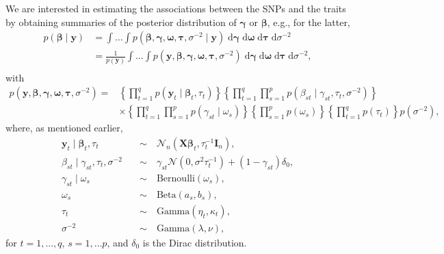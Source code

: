 \documentclass[a4paper, 11pt]{report}
\numberwithin{equation}{chapter}
\begin{document}
We are interested in estimating the associations between the SNPs and the traits by obtaining summaries of the posterior distribution of $\boldsymbol{\gamma}$ or $\boldsymbol{\beta}$, e.g., for the latter,
\begin{align*}
p(\boldsymbol{\beta}\mid\boldsymbol{y})&=\int\dots\int p(\boldsymbol{\beta},\boldsymbol{\gamma},\boldsymbol{\omega},\boldsymbol{\tau},\sigma^{-2}\mid\boldsymbol{y})\;\mathrm{d}\boldsymbol{\gamma}\;\mathrm{d}\boldsymbol{\omega}\;\mathrm{d}\boldsymbol{\tau}\;\mathrm{d}\sigma^{-2}\\
&=\frac{1}{p(\boldsymbol{y})}\int\dots\int p(\boldsymbol{y},\boldsymbol{\beta},\boldsymbol{\gamma},\boldsymbol{\omega},\boldsymbol{\tau},\sigma^{-2})\;\mathrm{d}\boldsymbol{\gamma}\;\mathrm{d}\boldsymbol{\omega}\;\mathrm{d}\boldsymbol{\tau}\;\mathrm{d}\sigma^{-2},\\
\end{align*}
with 
\begin{align*}
p(\boldsymbol{y},\boldsymbol{\beta},\boldsymbol{\gamma},\boldsymbol{\omega},\boldsymbol{\tau},\sigma^{-2}) = &\left\lbrace\prod_{t=1}^qp(\boldsymbol{y}_t \mid \boldsymbol{\beta}_t,\tau_t)\right\rbrace\left\lbrace\prod_{t=1}^q\prod_{s=1}^p p(\beta_{st} \mid \gamma_{st},\tau_t,\sigma^{-2})\right\rbrace\\
&\times \left\lbrace \prod_{t=1}^q\prod_{s=1}^p p(\gamma_{st} \mid \omega_s)\right\rbrace\left\lbrace \prod_{s=1}^p p(\omega_s)\right\rbrace\left\lbrace\prod_{t=1}^q p(\tau_t)\right\rbrace p(\sigma^{-2}),
\end{align*}
where, as mentioned earlier,
\begin{align*}
\boldsymbol{y}_t \mid \boldsymbol{\beta}_t,\tau_t \quad &\sim \quad \mathcal{N}_n\left(\boldsymbol{X}\boldsymbol{\beta}_t,\tau_t^{-1}\boldsymbol{I}_n\right),\\
\beta_{st} \mid \gamma_{st},\tau_t,\sigma^{-2} \quad &\sim \quad \gamma_{st}\mathcal{N}\left(0,\sigma^2\tau_t^{-1}\right)+(1-\gamma_{st})\delta_0,\\
\gamma_{st} \mid \omega_s \quad &\sim \quad \mathrm{Bernoulli}(\omega_s),\\
\omega_s \quad &\sim \quad \mathrm{Beta}(a_s,b_s),\\
\tau_t \quad &\sim \quad \mathrm{Gamma}(\eta_t,\kappa_t),\\
\sigma^{-2} \quad &\sim \quad \mathrm{Gamma}(\lambda, \nu),
\end{align*}
for $t=1,\dots,q$, $s=1,\dots p$, and $\delta_0$ is the Dirac distribution.
\newpage
\end{document}
